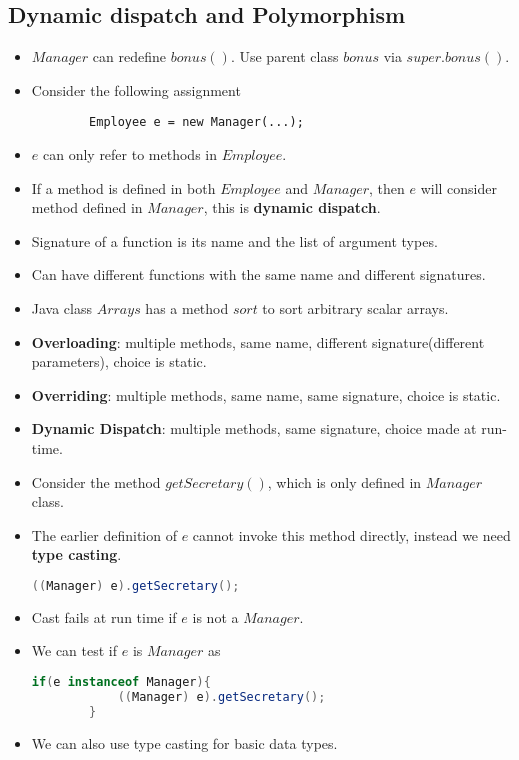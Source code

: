 \documentclass[a4paper]{article}
\begin{document}
\subsection{Dynamic dispatch and Polymorphism}
\begin{itemize}
    \item $Manager$ can redefine $bonus()$. Use parent class $bonus$ via $super.bonus()$.
    \item Consider the following assignment
    \begin{lstlisting}
        Employee e = new Manager(...);
    \end{lstlisting}
    \item $e$ can only refer to methods in $Employee$.
    \item If a method is defined in both $Employee$ and $Manager$, then $e$ will consider method defined in $Manager$, this is \textbf{dynamic dispatch}.
    \item Signature of a function is its name and the list of argument types.
    \item Can have different functions with the same name and different signatures.
    \item Java class $Arrays$ has a method $sort$ to sort arbitrary scalar arrays.
    \item \textbf{Overloading}: multiple methods, same name, different signature(different parameters), choice is static.
    \item \textbf{Overriding}: multiple methods, same name, same signature, choice is static.
    \item \textbf{Dynamic Dispatch}: multiple methods, same signature, choice made at run-time.
    \item Consider the method $getSecretary()$, which is only defined in $Manager$ class.
    \item The earlier definition of $e$ cannot invoke this method directly, instead we need \textbf{type casting}.
    \begin{lstlisting}[language=Java]
        ((Manager) e).getSecretary();
    \end{lstlisting}
    \item Cast fails at run time if $e$ is not a $Manager$.
    \item We can test if $e$ is $Manager$ as
    \begin{lstlisting}[language=Java]
        if(e instanceof Manager){
            ((Manager) e).getSecretary();
        }
    \end{lstlisting}
    \item We can also use type casting for basic data types.
\end{itemize}
\end{document}
